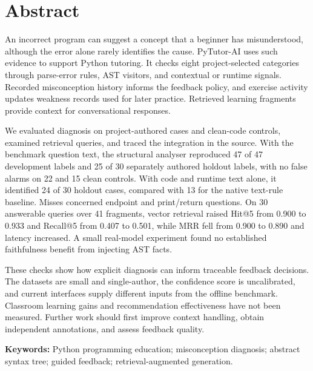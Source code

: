 \chapter*{Abstract}
An incorrect program can suggest a concept that a beginner has misunderstood, although the error alone rarely identifies the cause. PyTutor-AI uses such evidence to support Python tutoring. It checks eight project-selected categories through parse-error rules, AST visitors, and contextual or runtime signals. Recorded misconception history informs the feedback policy, and exercise activity updates weakness records used for later practice. Retrieved learning fragments provide context for conversational responses.

We evaluated diagnosis on project-authored cases and clean-code controls, examined retrieval queries, and traced the integration in the source. With the benchmark question text, the structural analyser reproduced 47 of 47 development labels and 25 of 30 separately authored holdout labels, with no false alarms on 22 and 15 clean controls. With code and runtime text alone, it identified 24 of 30 holdout cases, compared with 13 for the native text-rule baseline. Misses concerned endpoint and print/return questions. On 30 answerable queries over 41 fragments, vector retrieval raised Hit@5 from 0.900 to 0.933 and Recall@5 from 0.407 to 0.501, while MRR fell from 0.900 to 0.890 and latency increased. A small real-model experiment found no established faithfulness benefit from injecting AST facts.

These checks show how explicit diagnosis can inform traceable feedback decisions. The datasets are small and single-author, the confidence score is uncalibrated, and current interfaces supply different inputs from the offline benchmark. Classroom learning gains and recommendation effectiveness have not been measured. Further work should first improve context handling, obtain independent annotations, and assess feedback quality.

\vspace{5mm}
\noindent\textbf{Keywords:} Python programming education; misconception diagnosis; abstract syntax tree; guided feedback; retrieval-augmented generation.

